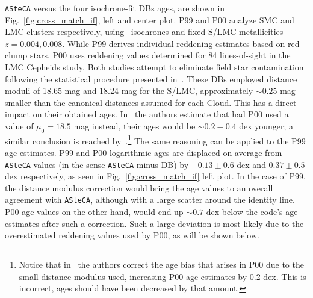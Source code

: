 \documentclass{aa}
\begin{document}
%
%
\texttt{ASteCA} versus the four isochrone-fit DBs ages, are shown in
Fig.~\ref{fig:cross_match_if}, left and center plot.
%
P99 and P00 analyze SMC and LMC clusters respectively,
using~\cite{Bertelli_1994} isochrones and fixed S/LMC metallicities
$z{=}0.004, 0.008$. While P99 derives individual reddening estimates based on
red clump stars, P00 uses reddening values determined for 84 lines-of-sight
in the~\cite{Udalski_1999} LMC Cepheids study.
%
Both studies attempt to eliminate field star contamination following the
statistical procedure presented in~\cite{Mateo_1986}.
These DBs employed distance moduli of 18.65 mag and 18.24 mag for the S/LMC,
approximately ${\sim}0.25$ mag smaller than the canonical distances assumed for
each Cloud. This has a direct impact on their obtained ages.
%
In~\cite{de_Grijs_2006} the authors estimate that had P00 used a value
of $\mu_0{=}18.5$ mag instead, their ages would be ${\sim}0.2{-}0.4$
dex younger; a similar conclusion is reached by~\cite{Baumgardt_2013}.\footnote
{Notice that in~\cite{Baumgardt_2013} the authors correct the age bias that
arises in P00 due to the small distance modulus used, increasing P00 age
estimates by 0.2 dex. This is incorrect, ages should have been decreased by that
amount.} The same reasoning can be applied to the P99 age estimates.
%
P99 and P00 logarithmic ages are displaced on average from \texttt{ASteCA}
values (in the sense \texttt{ASteCA} minus DB) by $-0.13{\pm}0.6$ dex and $0.37
{\pm}0.5$ dex respectively, as seen in Fig.~\ref{fig:cross_match_if} left plot.
In the case of P99, the distance modulus correction would bring the age values
to an overall agreement with \texttt{ASteCA}, although with a large scatter
around the identity line.
%
P00 age values on the other hand, would end up ${\sim}0.7$ dex below the code's
age estimates after such a correction. Such a large deviation is most likely due
to the overestimated reddening values used by P00, as will be shown below.
\end{document}
